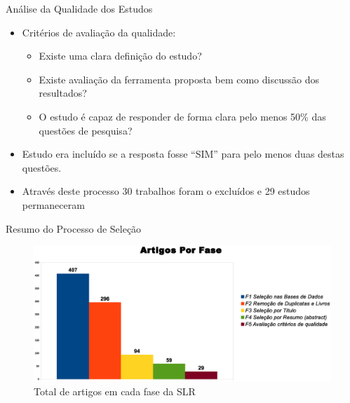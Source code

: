 \documentclass[t,14pt,mathserif]{beamer}
\begin{document}
\begin{frame}{Análise da Qualidade dos Estudos}
    \begin{itemize}
      \item Critérios de avaliação da qualidade:
           \begin{itemize}
                \item Existe uma clara definição do estudo?
                \item Existe avaliação da ferramenta proposta bem como discussão dos resultados?
                \item O estudo é capaz de responder de forma clara pelo menos
                  50\% das questões de pesquisa?
           \end{itemize}
       \item Estudo era incluído se a resposta fosse ``SIM'' para pelo menos duas
         destas questões.
       \item Através deste processo 30 trabalhos foram o excluídos e 29 estudos
         permaneceram

    \end{itemize}
\end{frame}
\begin{frame}{Resumo do Processo de Seleção}

\begin{figure}[htb]
\centering
\includegraphics[width=\textwidth]{../img/graph_fases.eps}
\caption{Total de artigos em cada fase da SLR}%
\end{figure}
\end{frame}
\end{document}
